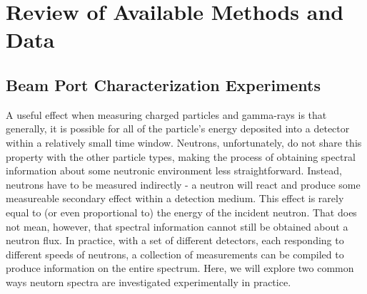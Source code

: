 \cleardoublepage

\chapter{Review of Available Methods and Data}


\section{Beam Port Characterization Experiments}

A useful effect when measuring charged particles and gamma-rays is that generally, it is possible for all of the particle's energy deposited into a detector within a relatively small time window.
Neutrons, unfortunately, do not share this property with the other particle types, making the process of obtaining spectral information about some neutronic environment less straightforward.
Instead, neutrons have to be measured indirectly - a neutron will react and produce some measureable secondary effect within a detection medium.
This effect is rarely equal to (or even proportional to) the energy of the incident neutron.
That does not mean, however, that spectral information cannot still be obtained about a neutron flux.
In practice, with a set of different detectors, each responding to different speeds of neutrons, a collection of measurements can be compiled to produce information on the entire spectrum.
Here, we will explore two common ways neutorn spectra are investigated experimentally in practice.

